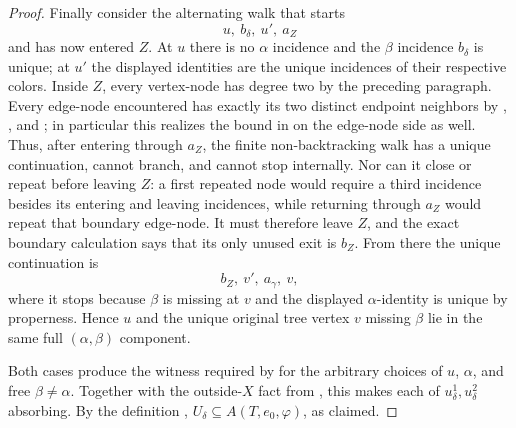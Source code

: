 \begin{proof}
Finally consider the alternating walk that starts
\[
 u,\ b_\delta,\ u',\ a_Z
\]
and has now entered $Z$.  At $u$ there is no $\alpha$ incidence and the
$\beta$ incidence $b_\delta$ is unique; at $u'$ the displayed identities
are the unique incidences of their respective colors.  Inside $Z$, every
vertex-node has degree two by the preceding paragraph.  Every edge-node
encountered has exactly its two distinct endpoint neighbors by
, , and
; in particular this realizes the bound in
 on the edge-node side as well.
Thus, after entering through $a_Z$, the finite non-backtracking walk has a
unique continuation, cannot branch, and cannot stop internally.  Nor can
it close or repeat before leaving $Z$: a first repeated node would require
a third incidence besides its entering and leaving incidences, while
returning through $a_Z$ would repeat that boundary edge-node.  It must
therefore leave $Z$, and the exact boundary calculation says that its only
unused exit is $b_Z$.  From there the unique continuation is
\[
 b_Z,\ v',\ a_\gamma,\ v,
\]
where it stops because $\beta$ is missing at $v$ and the displayed
$\alpha$-identity is unique by properness.  Hence $u$ and the unique
original tree vertex $v$ missing $\beta$ lie in the same full
$(\alpha,\beta)$ component.

Both cases produce the witness required by  for
the arbitrary choices of $u$, $\alpha$, and free $\beta\ne\alpha$.
Together with the outside-$X$ fact from
, this makes each of
$u^1_\delta,u^2_\delta$ absorbing.  By the definition
, $U_\delta\subseteq A(T,e_0,\varphi)$, as
claimed.
\end{proof}
